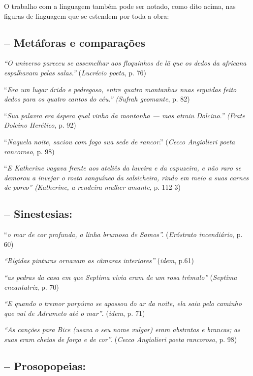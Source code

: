 \documentclass[12pt]{extarticle}
\begin{document}
O trabalho com a linguagem também pode ser notado, como dito acima, nas
figuras de linguagem que se estendem por toda a obra:


\subsection{-- Metáforas e comparações}

\emph{``O universo pareceu se assemelhar aos floquinhos de lã que os
dedos da africana espalhavam pelas salas.''} (\emph{Lucrécio poeta}, p.
76)

``\emph{Era um lugar árido e pedregoso, entre quatro montanhas nuas
erguidas feito dedos para os quatro cantos do céu.'' (Sufrah geomante},
p. 82)

``\emph{Sua palavra era áspera qual vinho da montanha --- mas atraiu
Dolcino.'' (Frate Dolcino Herético}, p. 92)

``\emph{Naquela noite, saciou com fogo sua sede de rancor}.''
(\emph{Cecco Angiolieri poeta rancoroso}, p. 98)

``\emph{E Katherine vagava frente aos ateliês da luveira e da capuzeira,
e não raro se demorou a invejar o rosto sanguíneo da salsicheira, rindo
em meio a suas carnes de porco'' (Katherine, a rendeira mulher amante},
p. 112-3)


\subsection{-- Sinestesias:}

``\emph{o mar de cor profunda, a linha brumosa de Samos''.}
(\emph{Eróstrato incendiário}, p. 60)

\emph{``Rígidas pinturas ornavam as câmaras interiores''} (\emph{idem},
p.61)

\emph{``as pedras da casa em que Septima vivia eram de um rosa
trêmulo''} (\emph{Septima encantatriz}, p. 70)

\emph{``E quando o tremor purpúreo se apossou do ar da noite, ela saiu
pelo caminho que vai de Adrumeto até o mar''}. (\emph{idem}, p. 71)

\emph{``As canções para Bice (usava o seu nome vulgar) eram abstratas e
brancas; as suas eram cheias de força e de cor''.} (\emph{Cecco
Angiolieri poeta rancoroso}, p. 98)

\subsection{-- Prosopopeias:}
\end{document}
